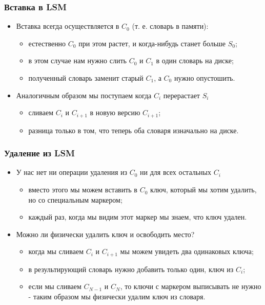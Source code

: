 \begin{frame}
\frametitle{Вставка в LSM}
\begin{itemize}
  \item Вставка всегда осуществляется в $C_0$ (т. е. словарь в памяти):
  \begin{itemize}
    \item естественно $C_0$ при этом растет, и когда-нибудь станет больше $S_0$;
    \item в этом случае нам нужно слить $C_0$ и $C_1$ в один словарь на диске;
    \item полученный словарь заменит старый $C_1$, а $C_0$ нужно опустошить.
  \end{itemize}
  \item Аналогичным образом мы поступаем когда $C_i$ перерастает $S_i$
  \begin{itemize}
    \item сливаем $C_i$ и $C_{i+1}$ в новую версию $C_{i+1}$;
    \item разница только в том, что теперь оба словаря изначально на диске.
  \end{itemize}
\end{itemize}
\end{frame}

\begin{frame}
\frametitle{Удаление из LSM}
\begin{itemize}
  \item У нас нет ни операции удаления из $C_0$ ни для всех остальных $C_i$
  \begin{itemize}
    \item вместо этого мы можем вставить в $C_0$ ключ, который мы хотим
    удалить, но со специальным маркером;
    \item каждый раз, когда мы видим этот маркер мы знаем, что ключ удален.
  \end{itemize}
  \item Можно ли физически удалить ключ и освободить место?
  \begin{itemize}
    \item когда мы сливаем $C_i$ и $C_{i+1}$ мы можем увидеть два одинаковых
    ключа;
    \item в результирующий словарь нужно добавить только один, ключ из $C_i$;
    \item если мы сливаем $C_{N-1}$ и $C_{N}$, то ключи с маркером выписывать
    не нужно - таким образом мы физически удалим ключ из словаря.
  \end{itemize}
\end{itemize}
\end{frame}

